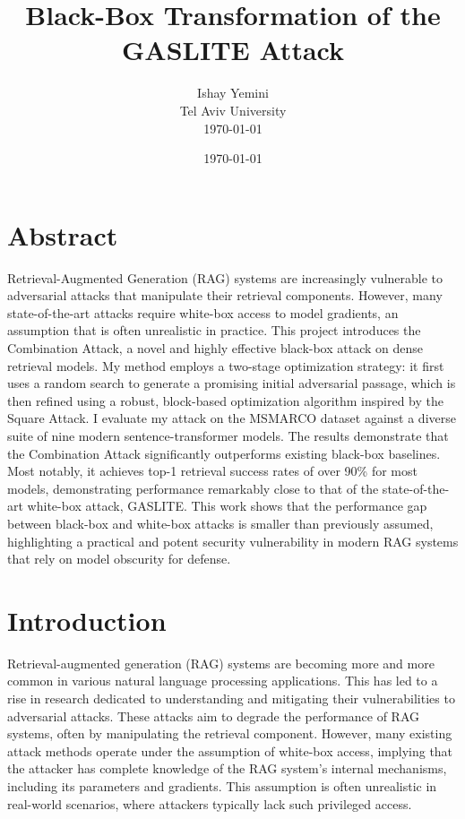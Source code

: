 \documentclass[a4paper, sigconf]{acmart}
\title{Black-Box Transformation of the GASLITE Attack}
\author{Ishay Yemini\\Tel Aviv University\\ \today}
\date{\today}
\begin{document}
\maketitle

\section*{Abstract}

Retrieval-Augmented Generation (RAG) systems are increasingly vulnerable to adversarial attacks that manipulate their retrieval components. However, many state-of-the-art attacks require white-box access to model gradients, an assumption that is often unrealistic in practice. This project introduces the Combination Attack, a novel and highly effective black-box attack on dense retrieval models. My method employs a two-stage optimization strategy: it first uses a random search to generate a promising initial adversarial passage, which is then refined using a robust, block-based optimization algorithm inspired by the Square Attack. I evaluate my attack on the MSMARCO dataset against a diverse suite of nine modern sentence-transformer models. The results demonstrate that the Combination Attack significantly outperforms existing black-box baselines. Most notably, it achieves top-1 retrieval success rates of over 90\% for most models, demonstrating performance remarkably close to that of the state-of-the-art white-box attack, GASLITE. This work shows that the performance gap between black-box and white-box attacks is smaller than previously assumed, highlighting a practical and potent security vulnerability in modern RAG systems that rely on model obscurity for defense.


\section{Introduction}

Retrieval-augmented generation (RAG) systems are becoming more and more common in various natural language processing applications. This has led to a rise in research dedicated to understanding and mitigating their vulnerabilities to adversarial attacks. These attacks aim to degrade the performance of RAG systems, often by manipulating the retrieval component. However, many existing attack methods operate under the assumption of white-box access, implying that the attacker has complete knowledge of the RAG system's internal mechanisms, including its parameters and gradients. This assumption is often unrealistic in real-world scenarios, where attackers typically lack such privileged access. 
\end{document}
